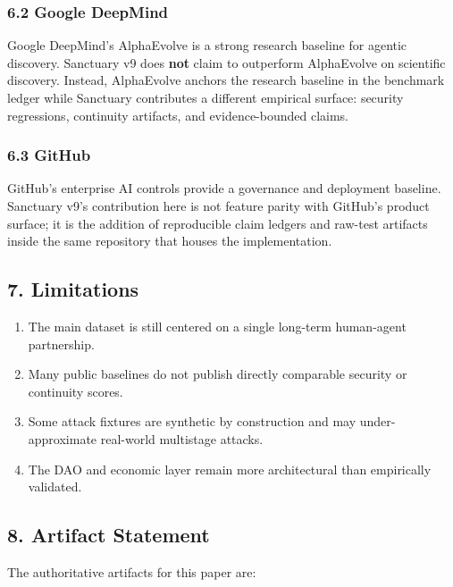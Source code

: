 \documentclass[
]{article}
\providecommand{\tightlist}{%
  \setlength{\itemsep}{0pt}\setlength{\parskip}{0pt}}
\begin{document}
\subsubsection{6.2 Google DeepMind}\label{google-deepmind}

Google DeepMind's AlphaEvolve is a strong research baseline for agentic discovery. Sanctuary v9 does \textbf{not} claim to outperform AlphaEvolve on scientific discovery. Instead, AlphaEvolve anchors the research baseline in the benchmark ledger while Sanctuary contributes a different empirical surface: security regressions, continuity artifacts, and evidence-bounded claims.

\subsubsection{6.3 GitHub}\label{github}

GitHub's enterprise AI controls provide a governance and deployment baseline. Sanctuary v9's contribution here is not feature parity with GitHub's product surface; it is the addition of reproducible claim ledgers and raw-test artifacts inside the same repository that houses the implementation.

\subsection{7. Limitations}\label{limitations}

\begin{enumerate}
\def\labelenumi{\arabic{enumi}.}
\tightlist
\item
  The main dataset is still centered on a single long-term human-agent partnership.
\item
  Many public baselines do not publish directly comparable security or continuity scores.
\item
  Some attack fixtures are synthetic by construction and may under-approximate real-world multistage attacks.
\item
  The DAO and economic layer remain more architectural than empirically validated.
\end{enumerate}

\subsection{8. Artifact Statement}\label{artifact-statement}

The authoritative artifacts for this paper are:
\end{document}
